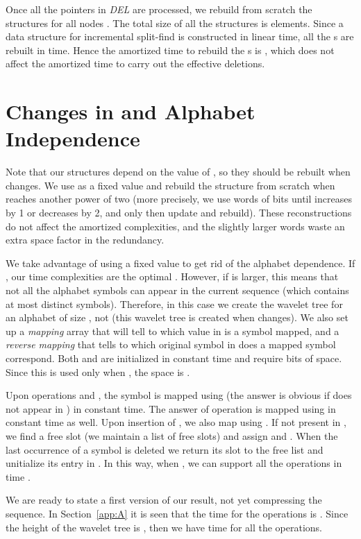 \documentclass[11pt]{article}
\begin{document}
Once all the pointers in {\em DEL} are processed, we rebuild from scratch 
the structures  for all nodes . The total size of all the
 structures is  elements. 
Since a data structure 
for incremental split-find is constructed in linear time, 
all the s are rebuilt in  time. 
Hence the amortized time to rebuild the s is 
, which does not affect the amortized time
 to carry out the effective deletions.

\section{Changes in  and Alphabet Independence}  \label{sec:space}

Note that our structures depend on the value of , so they
should be rebuilt when  changes. We use  as a
fixed value and rebuild the structure from scratch when  reaches another 
power of two (more precisely, we use words of  bits
until  increases by 1 or decreases by 2, and only then
update  and rebuild). These reconstructions do not affect the amortized 
complexities, and the slightly larger words waste an  extra space 
factor in the redundancy.

We take advantage of using a fixed  value 
to get rid of the alphabet dependence. If
, our time complexities are the optimal 
. However, if  is larger, this means that not all
the alphabet symbols can appear in the current sequence (which contains at most
 distinct symbols). Therefore, in this case we create
the wavelet tree for an alphabet of size , not 
(this wavelet tree is created when  changes).
We also set up a {\em mapping}
array  that will tell to which value in  is a symbol 
mapped, and
a {\em reverse mapping}  that tells to which original symbol in
 does a mapped symbol correspond. Both  and  are initialized
in constant time \cite[Section III.8.1]{Meh84} and require  bits of space. Since this is used only when , the
space is .

Upon operations  and , the symbol  is mapped using
 (the answer is obvious if  does not appear in ) in constant time.
The answer of operation  is mapped using  in constant time as 
well. Upon insertion of , we also map  using . If not present in ,
we find a free slot  (we maintain a list of free slots) and assign 
 and .
When the last occurrence of a symbol  is deleted we return its slot to
the free list and unitialize its entry in . In this way, when , we can support all the operations in time .

We are ready to state a first version of our result, not yet compressing
the sequence. In Section~\ref{app:A} it is seen
that the time for the operations is . Since the
height of the wavelet tree is , then we have  time 
for all the operations.
\end{document}
